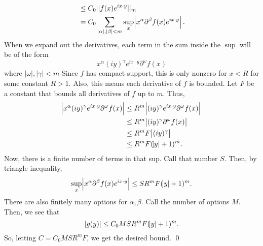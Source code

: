 \documentclass{article}
\renewcommand{\d}{\partial}
\begin{document}
\begin{enumerate}[(a)]
\begin{align*}
        & \le C_0 || f(x)e^{ix \cdot y}||_{m} \\
        &= C_0 \sum_{|\alpha|,|\beta| < m}\sup_x \abs{x^\alpha \d^\beta f(x)e^{ix \cdot y}}.
    \end{align*}
    When we expand out the derivatives, each term in the sum inside the $\sup$ will be of the form 
    \[x^\alpha (iy)^\gamma e^{ix \cdot y} \d^\omega f(x)\]
    where $|\omega|, |\gamma| < m$ Since $f$ has compact support, this is only nonzero for $x < R$ for some constant $R > 1$. Also, this means each derivative of $f$ is bounded. Let $F$ be a constant that bounds all derivatives of $f$ up to $m$. Thus, 
    \begin{align*}
        \abs{x^\alpha (iy)^\gamma e^{ix \cdot y} \d^\omega f(x)} &\le R^m \abs{ (iy)^\gamma e^{ix \cdot y} \d^\omega f(x)}\\
        &\le R^m \abs{ (iy)^\gamma\d^\omega f(x)}\\
        &\le R^m F \abs{ (iy)^\gamma}\\
        &\le R^m F (\abs{y}+1)^m.
    \end{align*}
    Now, there is a finite number of terms in that sup. Call that number $S$. Then, by triangle inequality,
    \[\sup_x \abs{x^\alpha \d^\beta f(x)e^{ix \cdot y}} \le S R^m F (\abs{y}+1)^m.\]
    There are also finitely many options for $\alpha, \beta$. Call the number of options $M$. Then, we see that 
    \[|g(y)| \le C_0 M S R^m F (\abs{y}+1)^m .\]
    So, letting $C = C_0 M S R^m F$, we get the desired bound. \qed
\end{enumerate}
\end{document}
